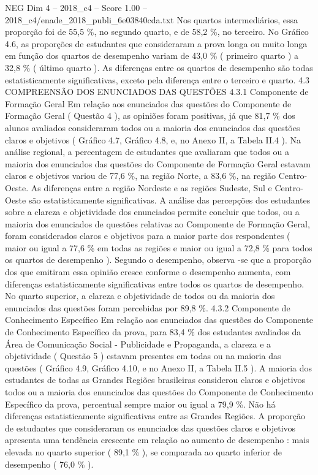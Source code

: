 \begin{textsample}{NEG Dim 4 – 2018\_c4 – Score 1.00 – 2018\_c4/enade\_2018\_publi\_6e03840cda.txt}
Nos quartos intermediários, essa proporção foi de 55,5 \%, no segundo quarto, e de 58,2 \%, no terceiro.
No Gráfico 4.6, as proporções de estudantes que consideraram a prova longa ou muito longa em função dos quartos de desempenho variam de 43,0 \% ( primeiro quarto ) a 32,8 \% ( último quarto ).
As diferenças entre os quartos de desempenho são todas estatisticamente significativas, exceto pela diferença entre o terceiro e quarto. 4.3 COMPREENSÃO DOS ENUNCIADOS DAS QUESTÕES 4.3.1 Componente de Formação Geral Em relação aos enunciados das questões do Componente de Formação Geral ( Questão 4 ), as opiniões foram positivas, já que 81,7 \% dos alunos avaliados consideraram todos ou a maioria dos enunciados das questões claros e objetivos ( Gráfico 4.7, Gráfico 4.8, e, no Anexo II, a Tabela II.4 ).
Na análise regional, a percentagem de estudantes que avaliaram que todos ou a maioria dos enunciados das questões do Componente de Formação Geral estavam claros e objetivos variou de 77,6 \%, na região Norte, a 83,6 \%, na região Centro-Oeste.
As diferenças entre a região Nordeste e as regiões Sudeste, Sul e Centro-Oeste são estatisticamente significativas.
A análise das percepções dos estudantes sobre a clareza e objetividade dos enunciados permite concluir que todos, ou a maioria dos enunciados de questões relativas ao Componente de Formação Geral, foram considerados claros e objetivos para a maior parte dos respondentes ( maior ou igual a 77,6 \% em todas as regiões e maior ou igual a 72,8 \% para todos os quartos de desempenho ).
Segundo o desempenho, observa -se que a proporção dos que emitiram essa opinião cresce conforme o desempenho aumenta, com diferenças estatisticamente significativas entre todos os quartos de desempenho.
No quarto superior, a clareza e objetividade de todos ou da maioria dos enunciados das questões foram percebidas por 89,8 \%. 4.3.2 Componente de Conhecimento Específico Em relação aos enunciados das questões do Componente de Conhecimento Específico da prova, para 83,4 \% dos estudantes avaliados da Área de Comunicação Social - Publicidade e Propaganda, a clareza e a objetividade ( Questão 5 ) estavam presentes em todas ou na maioria das questões ( Gráfico 4.9, Gráfico 4.10, e no Anexo II, a Tabela II.5 ).
A maioria dos estudantes de todas as Grandes Regiões brasileiras considerou claros e objetivos todos ou a maioria dos enunciados das questões do Componente de Conhecimento Específico da prova, percentual sempre maior ou igual a 79,9 \%.
Não há diferenças estatisticamente significativas entre as Grandes Regiões.
A proporção de estudantes que consideraram os enunciados das questões claros e objetivos apresenta uma tendência crescente em relação ao aumento de desempenho : mais elevada no quarto superior ( 89,1 \% ), se comparada ao quarto inferior de desempenho ( 76,0 \% ).

\end{textsample}
